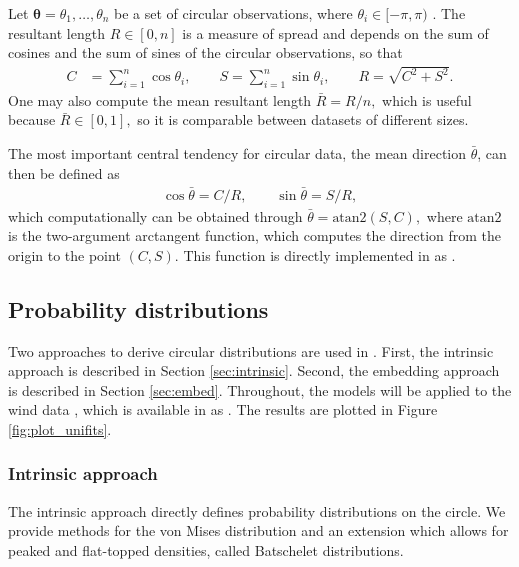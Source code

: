 Let \(\boldsymbol{\theta}= \theta_1, \dots, \theta_n\) be a set of
circular observations, where \(\theta_i \in [-\pi, \pi)\) . The
resultant length \(R\in[0, n]\) is a measure of spread and depends on
the sum of cosines and the sum of sines of the circular observations, so
that \begin{align}
C &= \sum_{i=1}^n\cos \theta_i, \qquad
S = \sum_{i=1}^n\sin \theta_i, \qquad
R = \sqrt{C^2 + S^2}.
\end{align} One may also compute the mean resultant length
\(\bar{R} = R/n,\) which is useful because \(\bar{R} \in [0, 1],\) so it
is comparable between datasets of different sizes.

The most important central tendency for circular data, the mean
direction \(\bar\theta\), can then be defined as \begin{align}
\cos \bar \theta = C/R, \qquad
\sin \bar \theta = S/R,
\end{align} which computationally can be obtained through
\(\bar \theta = \text{atan2}(S, C),\) where \(\text{atan2}\) is the
two-argument arctangent function, which computes the direction from the
origin to the point \((C, S)\). This function is directly implemented in
 as .

\hypertarget{probability-distributions}{%
\subsection{Probability distributions}\label{probability-distributions}}

\label{sec:probdist} Two approaches to derive circular distributions are
used in . First, the intrinsic approach is described in
Section \ref{sec:intrinsic}. Second, the embedding approach is described
in Section \ref{sec:embed}. Throughout, the models will be applied to
the wind data \citep{agostinelli2007robust, fisher1995statistical},
which is available in  as . The
results are plotted in Figure \ref{fig:plot_unifits}.

\hypertarget{intrinsic-approach}{%
\subsubsection{Intrinsic approach}\label{intrinsic-approach}}

\label{sec:intrinsic}

The intrinsic approach directly defines probability distributions on the
circle. We provide methods for the von Mises distribution and an
extension which allows for peaked and flat-topped densities, called
Batschelet distributions.

